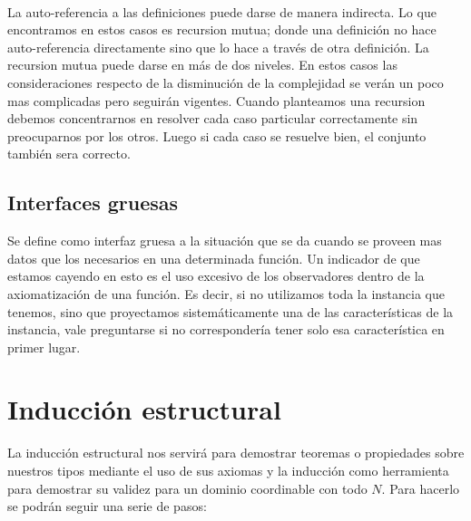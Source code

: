 \documentclass[10pt, a4paper]{report}
\begin{document}
~

La auto-referencia a las definiciones puede darse de manera indirecta. Lo que encontramos en estos casos es recursion mutua; donde una definici\'on no hace auto-referencia directamente sino que lo hace a trav\'es de otra definici\'on. La recursion mutua puede darse en m\'as de dos niveles. En estos casos las consideraciones respecto de la disminuci\'on de la complejidad se ver\'an un poco mas complicadas pero seguir\'an vigentes. Cuando planteamos una recursion debemos concentrarnos en resolver cada caso particular correctamente sin preocuparnos por los otros. Luego si cada caso se resuelve bien, el conjunto tambi\'en sera correcto.

\subsection{Interfaces gruesas}

Se define como interfaz gruesa a la situaci\'on que se da cuando se proveen mas datos que los necesarios en una determinada funci\'on. Un indicador de que estamos cayendo en esto es el uso excesivo de los observadores dentro de la axiomatizaci\'on de una funci\'on. Es decir, si no utilizamos toda la instancia que tenemos, sino que proyectamos sistem\'aticamente una de las caracter\'isticas de la instancia, vale preguntarse si no corresponder\'ia tener solo esa caracter\'istica en primer lugar.

\newpage
\section{Inducci\'on estructural}

La inducci\'on estructural nos servir\'a para demostrar teoremas o propiedades sobre nuestros tipos mediante el uso de sus axiomas y la inducci\'on como herramienta para demostrar su validez para un dominio coordinable con todo $N$. Para hacerlo se podr\'an seguir una serie de pasos:
\end{document}
